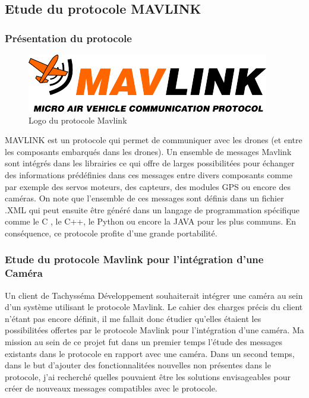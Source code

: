 \subsection{Etude du protocole MAVLINK }

\subsubsection{Présentation du protocole}

\begin{figure}[ht]
    \centering
    \includegraphics[scale=0.45]{img/mavlink.png}
    \caption{Logo du protocole Mavlink }
    \label{fig:CameraCmdsettings}
\end{figure}

MAVLINK est un protocole qui permet de communiquer avec les drones (et entre les composants embarqués dans les drones). Un ensemble de messages Mavlink sont intégrés dans les librairies ce qui offre de larges possibilitées pour échanger des informations prédéfinies dans ces messages entre divers composants comme par exemple des servos moteurs, des capteurs, des modules GPS ou encore des caméras. 
\newline
On note que l'ensemble de ces messages sont définis dans un fichier .XML qui peut ensuite être généré dans un langage de programmation spécifique comme le C , le C++, le Python ou encore la JAVA pour les plus communs. En conséquence, ce protocole profite d'une grande portabilité. 

\subsubsection{Etude du protocole Mavlink pour l'intégration d'une Caméra }

Un client de Tachysséma Développement souhaiterait intégrer une caméra au sein d'un système utilisant le protocole Mavlink. Le cahier des charges précis du client n'étant pas encore définit, il me fallait donc étudier qu'elles étaient les possibilitées offertes par le protocole Mavlink pour l'intégration d'une caméra. 
\newline
Ma mission au sein de ce projet fut dans un premier temps l'étude des messages existants dans le protocole en rapport avec une caméra. Dans un second temps, dans le but d'ajouter des fonctionnalitées nouvelles non présentes dans le protocole, j'ai recherché quelles pouvaient être les solutions envisageables pour créer de nouveaux messages compatibles avec le protocole. 

